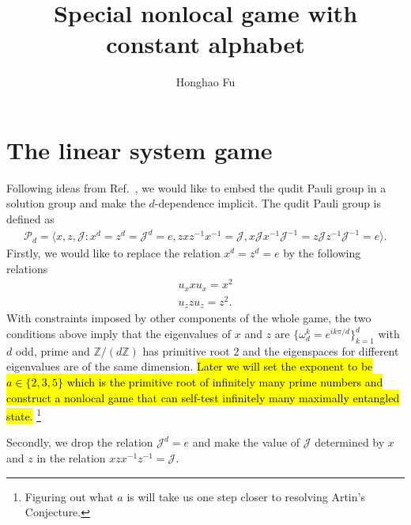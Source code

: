 \documentclass[11pt,letterpaper]{article}
\newcommand{\Z}{\mathbb{Z}}
\newcommand{\1}{\mathbb{1}}
\newcommand{\Pg}{\mathcal{P}}
\newcommand{\J}{\mathcal{J}}
\theoremstyle{definition}
\begin{document}
\title{Special nonlocal game with constant alphabet}

\author[1]{Honghao Fu}


\renewcommand\Affilfont{\itshape\small}


\maketitle


\section{The linear system game}
Following ideas from Ref.~\cite{coladan2017}, we would like to embed the qudit Pauli group in a solution group and
make the $d$-dependence implicit. The qudit Pauli group is defined as
\begin{align}
	\Pg_d = \langle x, z, \J : x^d = z^d = \J^d = e, zxz^{-1}x^{-1} = \J, x\J x^{-1}\J^{-1}= z\J z^{-1}\J^{-1} = e\rangle. 
\end{align}
Firstly, we would like to replace the relation $x^d = z^d = e$ by the following relations
\begin{align}
\label{eq:sim}
	u_x x u_x = x^2 \\
	u_z z u_z = z^2.
\end{align}
With constraints imposed by other components of the whole game, the two conditions above 
imply that the eigenvalues of $x$ and $z$ are $\{\omega_d^k = e^{ik\pi/d}\}_{k=1}^d$ with $d$ odd, prime and
$\Z/(d\Z)$ has primitive root $2$ and the eigenspaces for different eigenvalues are of the same dimension.
\hl{Later we will set the exponent to be $a \in \{2, 3, 5\}$ which is the primitive root of infinitely many prime numbers and
construct a nonlocal game that can self-test infinitely many maximally entangled state.}
\footnote{Figuring out what $a$ is will take us one step closer to resolving Artin's Conjecture\cite{murty1988}.}

Secondly, we drop the relation $\J^d = e$ and make the value of $\J$ determined by $x$ and $z$ in the 
relation $xzx^{-1}z^{-1} = \J$.
\end{document}
